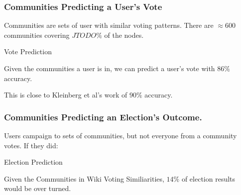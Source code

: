\documentclass{beamer}
\begin{document}
\begin{frame}\frametitle{Communities Predicting a User's Vote}
Communities are sets of user with similar voting patterns.  There are $\approx 600$ communities covering $JTODO \%$ of the nodes.
\newline
\newline

\begin{block}{Vote Prediction}
\begin{center}
Given the communities a user is in, we can predict a user's vote with $86\%$ accuracy.
\end{center}
\end{block}
 This is close to Kleinberg et al's work of $90 \%$ accuracy.

\end{frame}

\begin{frame}\frametitle{Communities Predicting an Election's Outcome.}
Users campaign to sets of communities, but not everyone from a community votes.  If they did:

\begin{block}{Election Prediction}
\begin{center}
Given the Communities in Wiki Voting Similiarities, $14\%$ of election results would be over turned.
\end{center}
\end{block}

\end{frame}
\end{document}
